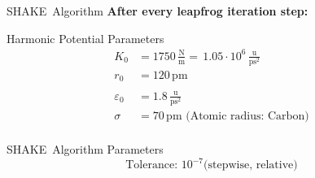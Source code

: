 \documentclass[14pt,c, german, aspectratio=169]{beamer} %
\begin{document}
\begin{frame}{SHAKE Algorithm}
    \vspace{0.5cm}
    \textbf{After every leapfrog iteration step:}

    \vspace{0.2cm}
    \begin{algorithm}[H]
        \vspace{0.2cm}

    \end{algorithm}
    \vspace{1cm}
\end{frame}

\begin{frame}{Harmonic Potential Parameters}
    \begin{align*} K_0 &= 1750 \,\frac{\textrm{N}}{\textrm{m}} =\, 1.05\cdot 10^6\, \frac{\textrm{u}}{\textrm{ps}^2}\\
        r_0 &= 120 \,\textrm{pm}\\
        \\
        \varepsilon_0 &= 1.8\, \frac{\textrm{u}}{\textrm{ps}^2}\\
        \sigma &= 70 \,\textrm{pm (Atomic radius: Carbon)}\\
    \end{align*}
\end{frame}

\begin{frame}{SHAKE Algorithm Parameters}
    \[\textrm{Tolerance: }10^{-7} \textrm{(stepwise, relative)}\]
    \\
\end{frame}
\end{document}
